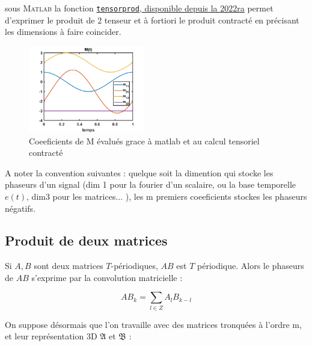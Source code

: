\documentclass[journal,onecolumn]{IEEEtran}
\begin{document}
sous \textsc{Matlab} la fonction \href{ https://fr.mathworks.com/help/matlab/ref/tensorprod.html }{\texttt{tensorprod}, disponible depuis la 2022ra} permet d'exprimer le produit de 2 tenseur et à fortiori le produit contracté en précisant les dimensions à faire coincider. 


\begin{figure}[h!]
\centering
\includegraphics[width=0.45\textwidth]{demoMt.png}
\caption{Coeeficients de M évalués grace à matlab et au calcul tensoriel contracté}
\end{figure}

A noter la convention suivantes : quelque soit la dimention qui stocke les phaseurs d'un signal (dim 1 pour la fourier d'un scalaire, ou la base temporelle $e(t)$, dim3 pour les matrices... ), les m premiers coeeficients stockes les phaseurs négatifs. 

\subsection{Produit de deux matrices}


Si $A,B$ sont deux matrices $T$-périodiques, $AB$ est $T$ périodique. Alors le phaseurs de $AB$ s'exprime par la convolution matricielle : 

\begin{equation}
AB_{k} = \sum_{l\in Z} A_{l} B_{k-l} 
\end{equation}

On suppose désormais que l'on travaille avec des matrices tronquées à l'ordre m, et leur représentation 3D $\mathfrak{A}$ et $\mathfrak{B}$ : 
\end{document}
